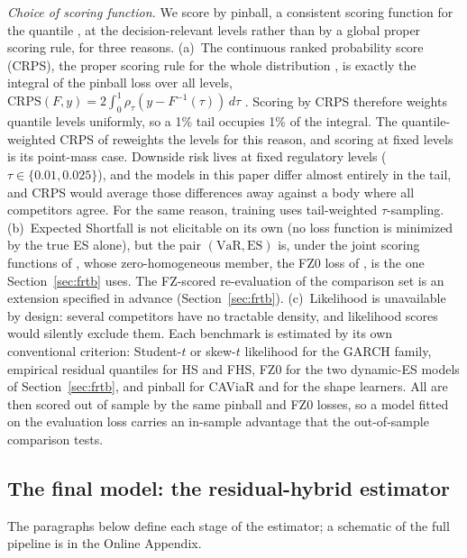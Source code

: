 \documentclass[11pt]{article}
\newcommand{\VaR}{\mathrm{VaR}}
\newcommand{\ES}{\mathrm{ES}}
\theoremstyle{remark}
\begin{document}
\emph{Choice of scoring function.} We score by pinball, a consistent scoring function for the quantile \citep{gneiting2011}, at the decision-relevant levels rather than by a global proper scoring rule, for three reasons. (a)~The continuous ranked probability
score (CRPS), the proper scoring rule for the whole distribution \citep{gneitingraftery2007}, is exactly the integral of the pinball loss over all
levels, $\mathrm{CRPS}(F,y) = 2\int_0^1 \rho_\tau(y - F^{-1}(\tau))\,
d\tau$ \citep{gneitingranjan2011}. Scoring by CRPS therefore weights
quantile levels uniformly, so a 1\% tail occupies 1\% of the
integral. The quantile-weighted CRPS of \citet{gneitingranjan2011} reweights the levels for this reason, and scoring at fixed levels is its point-mass case. Downside
risk lives at fixed regulatory levels ($\tau \in \{0.01, 0.025\}$), and
the models in this paper differ almost entirely in the tail, and CRPS
would average those differences away against a body where all
competitors agree. For the same reason, training uses tail-weighted $\tau$-sampling. (b)~Expected Shortfall is not elicitable
on its own \citep{gneiting2011} (no loss function is minimized by the true ES alone), but
the pair $(\VaR,\ES)$ is, under the joint scoring functions of
\citet{fissler2016}, whose zero-homogeneous member, the FZ0 loss of \citet{patton2019}, is the one Section~\ref{sec:frtb} uses. The FZ-scored re-evaluation of the comparison set is an extension specified in advance (Section~\ref{sec:frtb}). (c)~Likelihood is
unavailable by design: several competitors have no tractable density, and likelihood scores
would silently exclude them. Each benchmark is estimated by its own conventional criterion: Student-$t$ or skew-$t$ likelihood for the GARCH family, empirical residual quantiles for HS and FHS, FZ0 for the two dynamic-ES models of Section~\ref{sec:frtb}, and pinball for CAViaR and for the shape learners. All are then scored out of sample by the same pinball and FZ0 losses, so a model fitted on the evaluation loss carries an in-sample advantage that the out-of-sample comparison tests.

\subsection{The final model: the residual-hybrid estimator}\label{sec:hybrid}

The paragraphs below define each stage of the estimator; a schematic of the full pipeline is in the Online Appendix.
\end{document}
